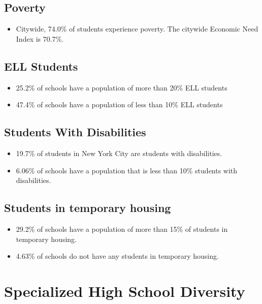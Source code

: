 \documentclass[11pt,]{article}
\providecommand{\tightlist}{%
  \setlength{\itemsep}{0pt}\setlength{\parskip}{0pt}}
\begin{document}
\hypertarget{poverty}{%
\subsection{Poverty}\label{poverty}}
\begin{itemize}
\tightlist
\item
  Citywide, 74.0\% of students experience poverty. The citywide Economic Need Index is 70.7\%.
\end{itemize}
\hypertarget{ell-students}{%
\subsection{ELL Students}\label{ell-students}}
\begin{itemize}
\tightlist
\item
  25.2\% of schools have a population of more than 20\% ELL students
\item
  47.4\% of schools have a population of less than 10\% ELL students
\end{itemize}
\hypertarget{students-with-disabilities}{%
\subsection{Students With Disabilities}\label{students-with-disabilities}}
\begin{itemize}
\item
  19.7\% of students in New York City are students with disabilities.
\item
  6.06\% of schools have a population that is less than 10\% students with disabilities.
\end{itemize}
\hypertarget{students-in-temporary-housing}{%
\subsection{Students in temporary housing}\label{students-in-temporary-housing}}
\begin{itemize}
\tightlist
\item
  29.2\% of schools have a population of more than 15\% of students in temporary housing.
\item
  4.63\% of schools do not have any students in temporary housing.
\end{itemize}
\hypertarget{specialized-high-school-diversity}{%
\section{Specialized High School Diversity}\label{specialized-high-school-diversity}}
\end{document}
